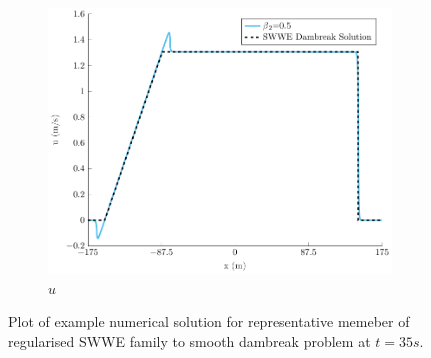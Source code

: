 \documentclass[10pt]{elsarticle}
\begin{document}
\begin{figure}
\begin{subfigure}{0.32\textwidth}
	\includegraphics[width=\textwidth]{./Figures/Simulations/Study/RegSWWE/Convergence/u.pdf}
	\caption{$u$}
	\end{subfigure}
	\caption{Plot of example numerical solution for representative memeber of regularised SWWE family to smooth dambreak problem at $t=35s$.}
\end{figure}
\end{document}

